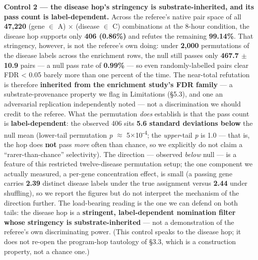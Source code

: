 \noindent \textbf{Control 2 --- the disease hop's stringency is substrate-inherited, and its pass count is label-dependent.}
Across the referee's native pair space of all \textbf{47,220} (gene $\in$ A) $\times$ (disease $\in$ C) combinations at the
8-hour condition, the disease hop supports only \textbf{406 (0.86\%)} and refutes the remaining \textbf{99.14\%}. That
stringency, however, is not the referee's own doing: under \textbf{2,000} permutations of the disease labels
across the enrichment rows, the null still passes only \textbf{467.7 $\pm$ 10.9} pairs --- a null pass rate of
\textbf{0.99\%} --- so even randomly-labelled pairs clear FDR \textless{} 0.05 barely more than one percent of the time. The
near-total refutation is therefore \textbf{inherited from the enrichment study's FDR family} --- a
substrate-provenance property we flag in Limitations (\S{}5.3), and one an adversarial replication
independently noted --- not a discrimination we should credit to the referee. What the permutation \emph{does}
establish is that the pass count is \textbf{label-dependent}: the observed 406 sits \textbf{5.6 standard deviations
below} the null mean (lower-tail permutation \emph{p} $\approx$ 5$\times$10\textsuperscript{-}\textsuperscript{4}; the \emph{upper}-tail \emph{p} is 1.0 --- that is, the hop
does \textbf{not} pass \emph{more} often than chance, so we explicitly do not claim a ``rarer-than-chance''
selectivity). The direction --- observed \emph{below} null --- is a feature of this restricted twelve-disease
permutation setup; the one component we actually measured, a per-gene concentration effect, is small (a
passing gene carries \textbf{2.39} distinct disease labels under the true assignment versus \textbf{2.44} under
shuffling), so we report the figures but do not interpret the mechanism of the direction further. The load-bearing reading is the
one we can defend on both tails: the disease hop is a \textbf{stringent, label-dependent nomination filter whose
stringency is substrate-inherited} --- not a demonstration of the referee's own discriminating power. (This
control speaks to the disease hop; it does not re-open the program-hop tautology of \S{}3.3, which is a
construction property, not a chance one.)

